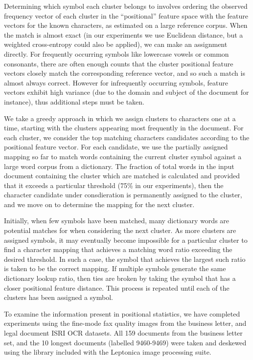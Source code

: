 \documentclass[times, 10pt,twocolumn]{article}
\begin{document}
Determining which symbol each cluster belongs to involves ordering the
observed frequency vector of each cluster in the ``positional''
feature space with the feature vectors for the known characters, as
estimated on a large reference corpus. When the match is almost exact
(in our experiments we use Euclidean distance, but a weighted
cross-entropy could also be applied), we can make an assignment
directly.  For frequently occurring symbols like lowercase vowels or
common consonants, there are often enough counts that the cluster
positional feature vectors closely match the corresponding reference
vector, and so such a match is almost always correct.  However for
infrequently occurring symbols, feature vectors exhibit high variance
(due to the domain and subject of the document for instance), thus
additional steps must be taken.

We take a greedy approach in which we assign clusters to characters
one at a time, starting with the clusters appearing most frequently in
the document. For each cluster, we consider the top matching
characters candidates according to the positional feature vector.  For
each candidate, we use the partially assigned mapping so far to match
words containing the current cluster symbol against a large word
corpus from a dictionary. The fraction of total words in the input
document containing the cluster which are matched is calculated and
provided that it exceeds a particular threshold (75\% in our
experiments), then the character candidate under consdieration is
permanently assigned to the cluster, and we move on to determine the
mapping for the next cluster.

Initially, when few symbols have been matched, many dictionary words
are potential matches for when considering the next cluster. As more
clusters are assigned symbols, it may eventually become impossible for
a particular cluster to find a character mapping that achieves a
matching word ratio exceeding the desired threshold.  In such a case,
the symbol that achieves the largest such ratio is taken to be the
correct mapping.  If multiple symbols generate the same dictionary
lookup ratio, then ties are broken by taking the symbol that has a
closer positional feature distance.  This process is repeated until
each of the clusters has been assigned a symbol.



To examine the information present in positional statistics, we have completed
experiments using the fine-mode fax quality images from the business letter, 
and legal document ISRI OCR datasets\cite{nartker2005}.  All 159 documents from
the business letter set, and the 10 longest documents (labelled 9460-9469) were
taken and deskewed using the library included with the Leptonica image
processing suite\cite{bloomberg2006}.
\end{document}
